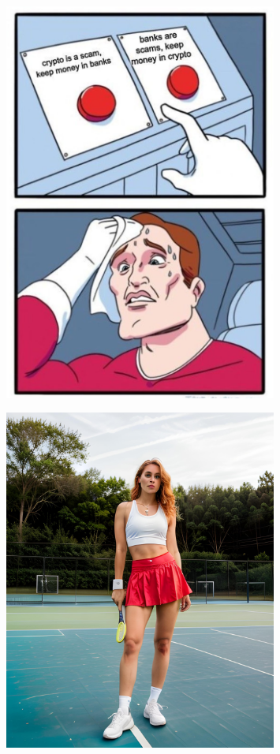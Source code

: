 \documentclass[a4paper]{article}
\begin{document}
\begin{figure}[htbp]
\centering
\includegraphics[width=0.8\textwidth]{meme-scam-banks.jpeg}

\label{fig:meme-scam-banks}
\end{figure}

\begin{figure}[htbp]
\centering
\includegraphics[width=0.8\textwidth]{meme-tennis.png}

\label{fig:meme-tennis}
\end{figure}
\end{document}
